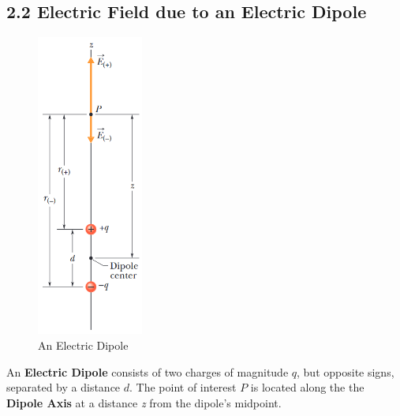 \documentclass[12pt, a4paper]{article}
\begin{document}
		
		\subsection*{2.2 Electric Field due to an Electric Dipole}
		
		\begin{figure}
			\centering
			\includegraphics[width=3.5cm]{Physics2_PNGs/elec-dipole.png}
			\caption{An Electric Dipole}
			\label{fig:electric-dipole}
		\end{figure}
	
		An \textbf{Electric Dipole} consists of two charges of magnitude $q$, but opposite signs, separated by a distance $d$. The point of interest $P$ is located along the the \textbf{Dipole Axis} at a distance \textit{z} from the dipole's midpoint. 
		
\end{document}
